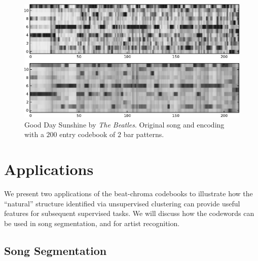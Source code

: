 \documentclass{article}
\begin{document}
\begin{figure}[htb]
\begin{center}
\includegraphics[width=.9\columnwidth]{song_encoded}
\end{center}
\caption{\small{Good Day Sunshine by \textit{The Beatles}.
Original song and encoding with a $200$ entry codebook of 
$2$ bar patterns.
}}
\label{fig:encodesong}
\end{figure}


\section{Applications}\label{sec:exps2}
We present two applications of the beat-chroma codebooks
to illustrate how the ``natural'' structure identified via 
unsupervised clustering can provide useful 
features for subsequent supervised tasks.  We will discuss how 
the codewords can be used in song segmentation, and for artist
recognition.  
%

\subsection{Song Segmentation} \label{ssec:segment}
\end{document}
